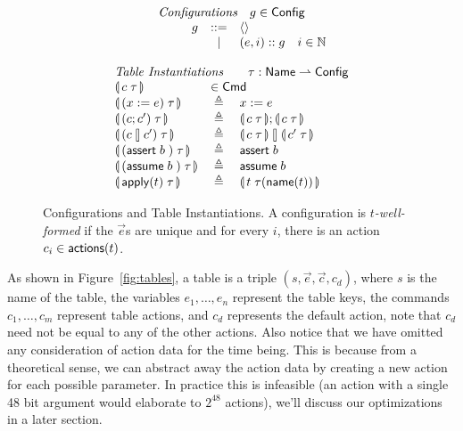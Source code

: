 \begin{figure}[ht]
  \[\begin{array}{l c l}
      \multicolumn{3}{c}{\textit{Configurations}\quad g \in \Config} \\
      \multicolumn 1 r g & ::= & \langle\rangle \\
        & \mid & (e,i)::g \quad i \in \mathbb N \\\\
      \multicolumn 3 l {\textit{Table Instantiations} \qquad \tau : \Name \rightharpoonup \mathsf{Config}}\\
      \parenbb{c\; \tau} &\multicolumn 2 l {\in \mathsf{Cmd}} \\
      \parenbb{(x:= e)\; \tau} &\triangleq& x := e \\
      \parenbb{(c;c')\; \tau} &\triangleq& \parenbb{c\; \tau};\parenbb{c\; \tau} \\
      \parenbb{(c\angel c')\; \tau} &\triangleq& \parenbb{c\; \tau} \angel \parenbb{c'\; \tau}\\
      \parenbb{(\assert b)\; \tau} &\triangleq& \assert b \\
      \parenbb{(\assume b)\; \tau} &\triangleq& \assume b \\
      \parenbb{\apply t\; \tau} &\triangleq& \parenbb{t\; \tau(\name t)}
    \end{array}\]

  \caption{Configurations and Table Instantiations. A configuration is
    \emph{$t$-well-formed} if the $\vec e$s are unique and for every
    $i$, there is an action $c_i \in \mathsf{actions}(t)$.}
  \label{fig:configs}

  
  
\end{figure}



As shown in Figure~\ref{fig:tables}, a table is a triple
$(s, \vec e, \vec c, c_d)$, where $s$ is the name of the table, the
variables $e_1,\ldots,e_n$ represent the table keys, the commands
$c_1,\ldots, c_m$ represent table actions, and $c_d$ represents the
default action, note that $c_d$ need not be equal to any of the other
actions. Also notice that we have omitted any consideration of action
data for the time being. This is because from a theoretical sense, we
can abstract away the action data by creating a new action for each
possible parameter. In practice this is infeasible (an action with a
single 48 bit argument would elaborate to $2^{48}$ actions), we'll
discuss our optimizations in a later section.

